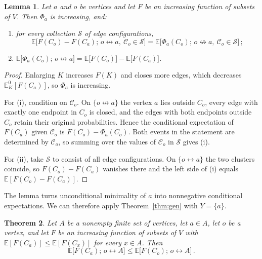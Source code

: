 \documentclass[11pt]{article}
\newtheorem{theorem}{Theorem}[section]
\newtheorem{lemma}[theorem]{Lemma}
\theoremstyle{definition}
\theoremstyle{remark}
\newcommand{\EE}{\mathbb E}
\newcommand{\con}{\leftrightarrow}
\newcommand{\ncon}{\nleftrightarrow}
\newcommand{\eC}{\mathcal C}
\begin{document}
\begin{lemma}\label{lem:proj}
Let $a$ and $o$ be vertices and let $F$ be an increasing function of subsets of $V$. Then
$\Phi_a$ is increasing, and:
\begin{enumerate}[label=\textup{(\roman*)}]
\item for every collection $\mathcal S$ of edge configurations,
\[
 \EE\bigl[F(C_o)-F(C_a);\,o\ncon a,\ \eC_o\in\mathcal S\bigr]
 =\EE\bigl[\Phi_a(C_o);\,o\ncon a,\ \eC_o\in\mathcal S\bigr]\,;
\]
\item $\EE\bigl[\Phi_a(C_o);\,o\ncon a\bigr]=\EE\bigl[F(C_o)\bigr]-\EE\bigl[F(C_a)\bigr]$.
\end{enumerate}
\end{lemma}

\begin{proof}
Enlarging $K$ increases $F(K)$ and closes more edges, which decreases
$\EE_K^0[F(C_a)]$, so $\Phi_a$ is increasing.

For (i), condition on $\eC_o$. On $\{o\ncon a\}$ the vertex $a$ lies outside $C_o$, every
edge with exactly one endpoint in $C_o$ is closed, and the edges with both endpoints
outside $C_o$ retain their original probabilities. Hence the conditional expectation of $F(C_a)$ given
$\eC_o$ is $F(C_o)-\Phi_a(C_o)$. Both events in the statement are determined by $\eC_o$, so
summing over the values of $\eC_o$ in $\mathcal S$ gives (i).

For (ii), take $\mathcal S$ to consist of all edge configurations. On $\{o\con a\}$ the two
clusters coincide, so $F(C_o)-F(C_a)$ vanishes there and the left side of (i) equals
$\EE[F(C_o)-F(C_a)]$.
\end{proof}

The lemma turns unconditional minimality of $a$ into nonnegative conditional expectations. We can
therefore apply Theorem~\ref{thm:gen} with $Y=\{a\}$.

\begin{theorem}\label{thm:fixedmin}
Let $A$ be a nonempty finite set of vertices, let $a\in A$, let $o$ be a vertex, and let
$F$ be an increasing function of subsets of $V$ with $\EE[F(C_a)]\le\EE[F(C_x)]$ for every
$x\in A$. Then
\[
 \EE\bigl[F(C_a);\,o\con A\bigr]\leq \EE\bigl[F(C_o);\,o\con A\bigr]\,.
\]
\end{theorem}
\end{document}

